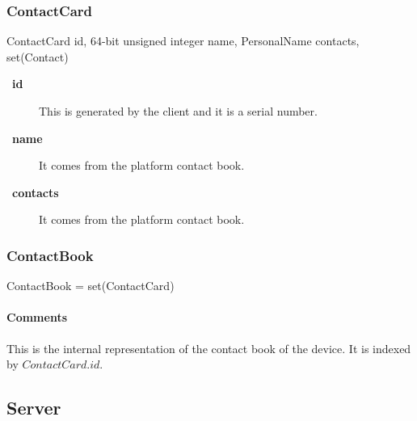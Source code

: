 \documentclass[a4paper,10pt,draft]{article}
\let\Item\item
\newcommand\SpecialItem{\renewcommand\item[1][]{\Item[\textbullet~\bfseries##1]}
}
\begin{document}
\subsubsection{ContactCard}

\begin{verbbox}
ContactCard
{
  id, 64-bit unsigned integer
  name, PersonalName
  contacts, set(Contact)
}
\end{verbbox}
\begin{center}
\theverbbox
\end{center}

\begin{inparaitem}[ ]
 \item \infrastructure
\end{inparaitem}

\SpecialItem
\begin{description}
 \item[id] This is generated by the client and it is a serial number.
 \item[name] It comes from the platform contact book.
 \item[contacts] It comes from the platform contact book.
\end{description}

\subsubsection{ContactBook}

\begin{verbbox}
ContactBook = set(ContactCard)
\end{verbbox}
\begin{center}
\theverbbox
\end{center}

\begin{inparaitem}[ ]
 \item \persistent
 \item \unsecure
 \item \unique
\end{inparaitem}

\paragraph*{Comments}
This is the internal representation of the contact book of the device. It is indexed by $ContactCard.id$.

\subsection{Server}
\label{sec:structure:server}
\end{document}

